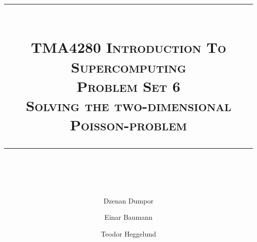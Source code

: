 





\author{Dzenan Dumpor \and Einar Baumann \and Teodor Heggelund}
\title{
    \vspace{-1in}
    \vspace{0.1in}
    \rule{\textwidth}{0.5pt} \\[0.5cm]
    \normalfont \normalsize \textsc{TMA4280 Introduction To Supercomputing} \\ [20pt]
    {\textsc{ \huge Problem Set 6 }} \\ [0.5cm]
    {\textsc {\Large Solving the two-dimensional Poisson-problem} } \\
    \vspace{0.1in}
    \rule{\textwidth}{2pt} \\[0.7cm]
}


\maketitle
\thispagestyle{empty}
\clearpage














